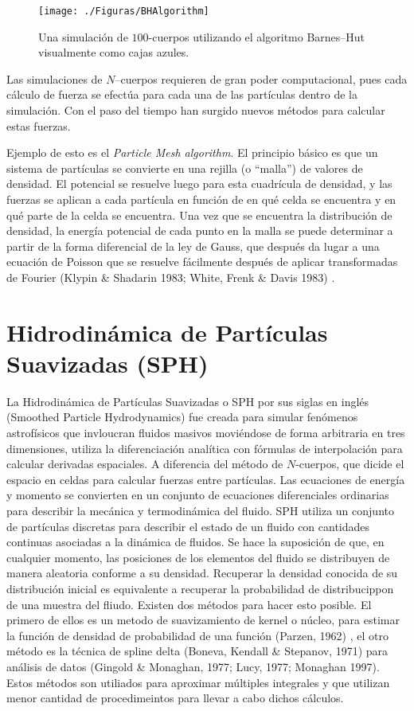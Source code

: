 \documentclass[a4paper,openright,12pt]{book}
\begin{document}
\begin{figure}
\centering
  \texttt{[image: ./Figuras/BHAlgorithm]}
  \caption{\footnotesize{Una simulación de $100$-cuerpos utilizando el algoritmo Barnes--Hut visualmente como cajas azules.}}
  \label{fig 2.1}
\end{figure}

Las simulaciones de $N$--cuerpos requieren de gran poder computacional, pues cada cálculo de fuerza se efectúa para cada una de las partículas dentro de la simulación. Con el paso del tiempo han surgido nuevos métodos para calcular estas fuerzas. 

Ejemplo de esto es el \textit{Particle Mesh algorithm}. El principio básico es que un sistema de partículas se convierte en una rejilla (o ``malla'') de valores de densidad. El potencial se resuelve luego para esta cuadrícula de densidad, y las fuerzas se aplican a cada partícula en función de en qué celda se encuentra y en qué parte de la celda se encuentra. Una vez que se encuentra la distribución de densidad, la energía potencial de cada punto en la malla se puede determinar a partir de la forma diferencial de la ley de Gauss, que después da lugar a una ecuación de Poisson que se resuelve fácilmente después de aplicar transformadas de Fourier (Klypin \& Shadarin 1983; White, Frenk \& Davis 1983) \cite{b5.1, b5.2}.




\section{Hidrodinámica de Partículas Suavizadas (SPH)}

La Hidrodinámica de Partículas Suavizadas o SPH por sus siglas en inglés (Smoothed Particle Hydrodynamics) fue creada para simular fenómenos astrofísicos que invloucran fluidos masivos moviéndose de forma arbitraria en tres dimensiones, utiliza la diferenciación analítica con fórmulas de interpolación para calcular derivadas espaciales. A diferencia del método de $N$-cuerpos, que dicide el espacio en celdas para calcular fuerzas entre partículas. Las ecuaciones de energía y momento se convierten en un conjunto de ecuaciones diferenciales ordinarias para describir la mecánica y termodinámica del fluido. SPH utiliza un conjunto de partículas discretas para describir el estado de un fluido con cantidades continuas asociadas a la dinámica de fluidos. Se hace la suposición de que, en cualquier momento, las posiciones de los elementos del fluido se  distribuyen de manera aleatoria conforme a su densidad. Recuperar la densidad conocida de su distribución inicial es equivalente a recuperar la probabilidad de distribucippon de una muestra del fliudo. Existen dos métodos para hacer esto posible. El primero de ellos es un metodo de suavizamiento de kernel o núcleo, para estimar la función de densidad de probabilidad de una función (Parzen, 1962) \cite{b5.3}, el otro método es la técnica de spline delta (Boneva, Kendall \& Stepanov, 1971) \cite{b5.4} para análisis de datos (Gingold \& Monaghan, 1977; Lucy, 1977; Monaghan 1997)\cite{b6,b7}. Estos métodos son utiliados para aproximar múltiples integrales y que utilizan menor cantidad de procedimeintos para llevar a cabo dichos cálculos.
\end{document}
